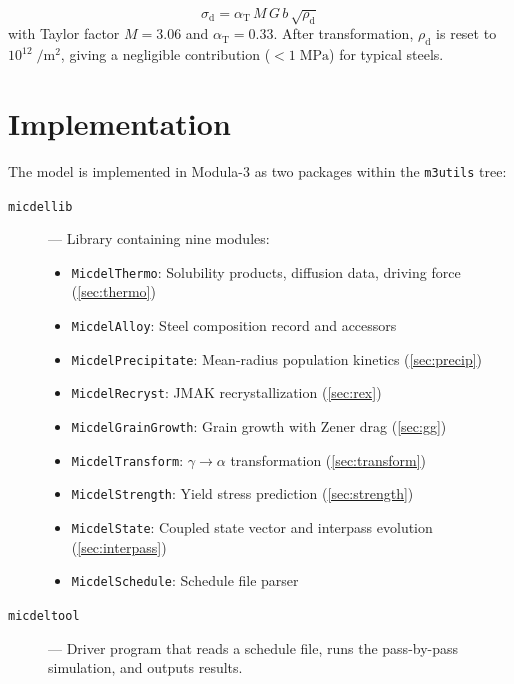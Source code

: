 \documentclass[11pt,a4paper]{article}
\newcommand{\rhod}{\ensuremath{\rho_\mathrm{d}}}
\begin{document}
\begin{equation}
  \sigma_\mathrm{d} = \alpha_\mathrm{T}\,M\,G\,b\,\sqrt{\rhod}
  \label{eq:taylor}
\end{equation}
with Taylor factor $M = 3.06$ and $\alpha_\mathrm{T} = 0.33$.  After
transformation, $\rhod$ is reset to $10^{12}\;\si{\per\metre\squared}$,
giving a negligible contribution ($< 1\;\mathrm{MPa}$) for typical steels.

\section{Implementation}
\label{sec:impl}

The model is implemented in Modula-3 \cite{m3} as two packages within the
\texttt{m3utils} tree:

\begin{description}
  \item[\texttt{micdellib}] --- Library containing nine modules:
    \begin{itemize}
      \item \texttt{MicdelThermo}: Solubility products, diffusion data,
            driving force (\cref{sec:thermo})
      \item \texttt{MicdelAlloy}: Steel composition record and accessors
      \item \texttt{MicdelPrecipitate}: Mean-radius population kinetics
            (\cref{sec:precip})
      \item \texttt{MicdelRecryst}: JMAK recrystallization (\cref{sec:rex})
      \item \texttt{MicdelGrainGrowth}: Grain growth with Zener drag
            (\cref{sec:gg})
      \item \texttt{MicdelTransform}: $\gamma\to\alpha$ transformation
            (\cref{sec:transform})
      \item \texttt{MicdelStrength}: Yield stress prediction
            (\cref{sec:strength})
      \item \texttt{MicdelState}: Coupled state vector and interpass evolution
            (\cref{sec:interpass})
      \item \texttt{MicdelSchedule}: Schedule file parser
    \end{itemize}
  \item[\texttt{micdeltool}] --- Driver program that reads a schedule file,
    runs the pass-by-pass simulation, and outputs results.
\end{description}
\end{document}
